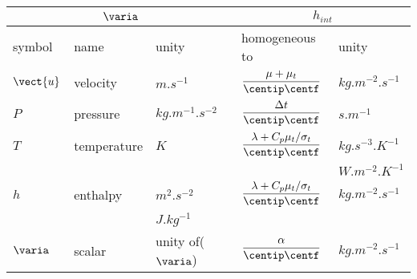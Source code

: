 \begin{table}
\begin{center}
\begin{tabular}{||l|l|l||l|l||}
\hline
\multicolumn{3}{||c||}{$\varia$} & \multicolumn{2}{c||}{$h_{int}$}     \\
\hline
symbol                        & name                        & unity                    & homogeneous to                        & unity            \\
\hline
$\vect{u}$                    & velocity                    & $m.s^{-1}$               &$\dfrac{\mu+\mu_t}{ \centip \centf}$   & $kg.m^{-2}.s^{-1}$       \\
$P$                           & pressure                    & $kg.m^{-1}.s^{-2}$       & $\dfrac{\Delta t}{ \centip \centf}$   & $s.m^{-1}$                \\
$T$                           & temperature                 & $K$                      &$\dfrac{\lambda+C_p\mu_t/\sigma_t}{ \centip \centf}$  &$kg.s^{-3}.K^{-1}$\\
                              &                             &                          &                                       & $W.m^{-2}.K^{-1}$\\
$h$                           & enthalpy                    & $m^{2}.s^{-2}$           &$\dfrac{\lambda+C_p\mu_t/\sigma_t}{ \centip \centf}$ &$kg.m^{-2}.s^{-1}$\\
                              &                             & $J.kg^{-1} $             &                                                            &                                  \\
$\varia$                      & scalar                      & unity of($\varia$)       &$\dfrac{\alpha}{ \centip \centf}$      & $kg.m^{-2}.s^{-1}$       \\
\hline
\end{tabular}
\end{center}


\end{table}
